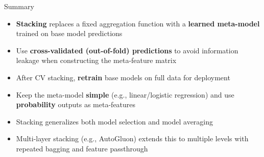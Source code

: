 \documentclass[11pt,compress,t,notes=noshow, xcolor=table]{beamer}
\begin{document}

\begin{vbframe}{Summary}
\vfill
\begin{itemize}
    \item \textbf{Stacking} replaces a fixed aggregation function with a \textbf{learned meta-model} trained on base model predictions
    \item Use \textbf{cross-validated (out-of-fold) predictions} to avoid information leakage when constructing the meta-feature matrix
    \item After CV stacking, \textbf{retrain} base models on full data for deployment
    \item Keep the meta-model \textbf{simple} (e.g., linear/logistic regression) and use \textbf{probability} outputs as meta-features
    \item Stacking generalizes both model selection and model averaging
    \item Multi-layer stacking (e.g., AutoGluon) extends this to multiple levels with repeated bagging and feature passthrough
\end{itemize}
\vfill
\end{vbframe}


%


\endlecture
\end{document}
